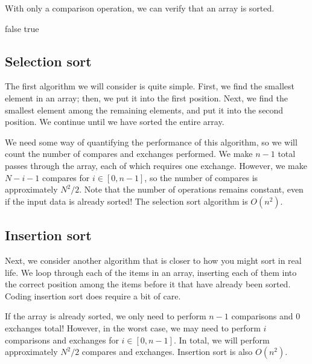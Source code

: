 With only a comparison operation, we can verify that an array is sorted.

\begin{algorithm}[H]
\caption{}
\begin{algorithmic}
            \State \Return false
        \EndIf
    \EndFor
    \State \Return true
\EndFunction
\end{algorithmic}
\end{algorithm}


\subsection{Selection sort}

The first algorithm we will consider is quite simple. First, we find the smallest element in an array; then, we put it into the first position. Next, we find the smallest element among the remaining elements, and put it into the second position. We continue until we have sorted the entire array.

We need some way of quantifying the performance of this algorithm, so we will count the number of compares and exchanges performed. We make $n-1$ total passes through the array, each of which requires one exchange. However, we make $N-i-1$ compares for $i \in [0, n-1]$, so the number of compares is approximately $N^2/2$. Note that the number of operations remains constant, even if the input data is already sorted!  The selection sort algorithm is $ O(n^2) $.


\subsection{Insertion sort}

Next, we consider another algorithm that is closer to how you might sort in real life. We loop through each of the items in an array, inserting each of them into the correct position among the items before it that have already been sorted. Coding insertion sort does require a bit of care.

If the array is already sorted, we only need to perform $n-1$ comparisons and $0$ exchanges total! However, in the worst case, we may need to perform $i$ comparisons and exchanges for $i \in [0, n-1]$. In total, we will perform approximately $N^2/2$ compares and exchanges.  Insertion sort is also $ O(n^2) $.


